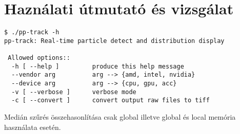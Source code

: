 \chapter{Haználati útmutató és vizsgálat}
\begin{lstlisting}
$ ./pp-track -h
pp-track: Real-time particle detect and distribution display

 Allowed options::
  -h [ --help ]         produce this help message
  --vendor arg          arg --> {amd, intel, nvidia}
  --device arg          arg --> {cpu, gpu, acc}
  -v [ --verbose ]      verbose mode
  -c [ --convert ]      convert output raw files to tiff
\end{lstlisting}
Medián szűrés összehasonlítása csak global illetve global és local memória használata esetén.
